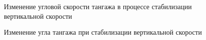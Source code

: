 \begin{figure}[H]
    \caption{Изменение угловой скорости тангажа в процессе стабилизации вертикальной скорости}
    \label{fig:Изменение угловой скорости тангажа в процессе стабилизации вертикальной скорости}
\end{figure}

\begin{figure}[H]
    \caption{Изменение угла тангажа при стабилизации вертикальной скорости}
    \label{fig:Входной сигнал системы изменения тангажа}
\end{figure}

